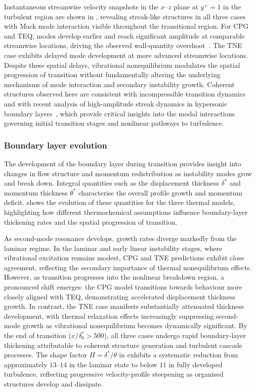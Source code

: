 Instantaneous streamwise velocity snapshots in the $x$--$z$ plane at $y^+ = 1$ in the turbulent region are shown in , revealing streak-like structures in all three cases with Mack mode interaction visible throughout the transitional region. For \gls{CPG} and \gls{TEQ}, modes develop earlier and reach significant amplitude at comparable streamwise locations, driving the observed wall-quantity overshoot~\citep{SchlatturEtAl2008}. The \gls{TNE} case exhibits delayed mode development at more advanced streamwise locations. Despite these spatial delays, vibrational nonequilibrium modulates the spatial progression of transition without fundamentally altering the underlying mechanisms of mode interaction and secondary instability growth. Coherent structures observed here are consistent with incompressible transition dynamics~\citep{SchoppaHussain2002,SchlatturEtAl2008} and with recent analysis of high-amplitude streak dynamics in hypersonic boundary layers~\citep{CaillaurdEtAl2025}, which provide critical insights into the modal interactions governing initial transition stages and nonlinear pathways to turbulence.


\subsubsection{Boundary layer evolution}

The development of the boundary layer during transition provides insight into changes in flow structure and momentum redistribution as instability modes grow and break down. Integral quantities such as the displacement thickness $\delta^*$ and momentum thickness $\theta^*$ characterise the overall profile growth and momentum deficit.  shows the evolution of these quantities for the three thermal models, highlighting how different thermochemical assumptions influence boundary-layer thickening rates and the spatial progression of transition.

As second-mode resonance develops, growth rates diverge markedly from the laminar regime. In the laminar and early linear instability stages, where vibrational excitation remains modest, \gls{CPG} and \gls{TNE} predictions exhibit close agreement, reflecting the secondary importance of thermal nonequilibrium effects. However, as transition progresses into the nonlinear breakdown region, a pronounced shift emerges: the \gls{CPG} model transitions towards behaviour more closely aligned with \gls{TEQ}, demonstrating accelerated displacement thickness growth. In contrast, the \gls{TNE} case manifests substantially attenuated thickness development, with thermal relaxation effects increasingly suppressing second-mode growth as vibrational nonequilibrium becomes dynamically significant. By the end of transition ($x/\delta^*_0 > 500$), all three cases undergo rapid boundary-layer thickening attributable to coherent structure generation and turbulent cascade processes. The shape factor $H = \delta^* / \theta$ in  exhibits a systematic reduction  from approximately $13$--$14$ in the laminar state to below $11$ in fully developed turbulence, reflecting progressive velocity-profile steepening as organised structures develop and dissipate.


